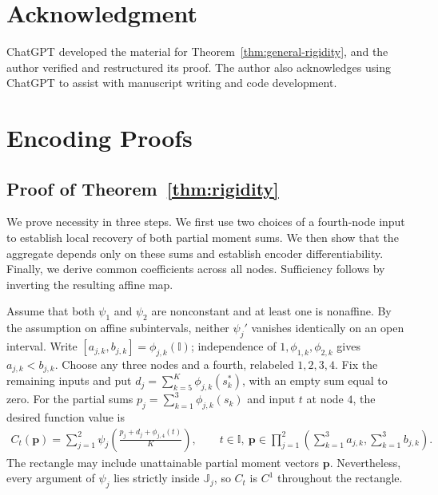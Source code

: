 \documentclass[journal,12pt,onecolumn,draftclsnofoot]{IEEEtran}
\begin{document}
\section{Acknowledgment}

ChatGPT developed the material for Theorem~\ref{thm:general-rigidity}, and the author verified and restructured its proof. The author also acknowledges using ChatGPT to assist with manuscript writing and code development.

\appendices

\section{Encoding Proofs}

\subsection{Proof of Theorem~\ref{thm:rigidity}}
\label{app:rigidity-proof}


We prove necessity in three steps. We first use two choices
of a fourth-node input to establish local recovery of both
partial moment sums. We then show that the aggregate depends
only on these sums and establish encoder differentiability.
Finally, we derive common coefficients across all nodes.
Sufficiency follows by inverting the resulting affine map.


Assume that both $\psi_1$ and $\psi_2$ are nonconstant and at least one is
nonaffine. By the assumption on affine subintervals, neither $\psi_j'$ vanishes identically on an open interval.
Write $[a_{j,k},b_{j,k}]=\phi_{j,k}(\mathbb I)$; independence of
$1,\phi_{1,k},\phi_{2,k}$ gives $a_{j,k}<b_{j,k}$.
Choose any three nodes and a fourth, relabeled $1,2,3,4$.
Fix the remaining inputs and put
$d_j=\sum_{k=5}^K\phi_{j,k}(s_k^*)$, with an empty sum equal to zero.
For the partial sums $p_j=\sum_{k=1}^3\phi_{j,k}(s_k)$ and
input $t$ at node $4$, the desired function value is
 \begin{align*}
 C_t(\boldsymbol p)=\sum\nolimits_{j=1}^2
 \psi_j\!\left(\frac{p_j+d_j+\phi_{j,4}(t)}K\right),
 \qquad t\in\mathbb I,~ 
 \boldsymbol p\in
 \prod_{j=1}^2\left(\sum_{k=1}^3a_{j,k},\sum_{k=1}^3b_{j,k}\right).
 \end{align*}
The rectangle may include unattainable partial moment vectors $\boldsymbol p$. Nevertheless, every argument of $\psi_j$ lies strictly inside $\mathbb J_j$,
so $C_t$ is $C^1$ throughout the rectangle.
\end{document}
